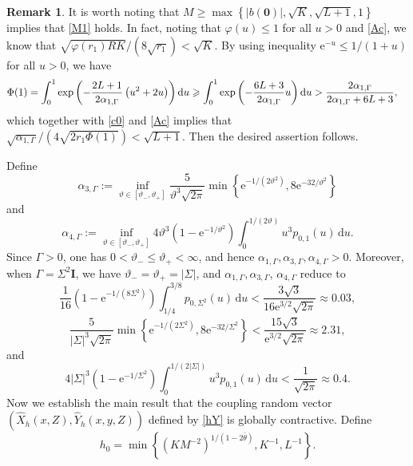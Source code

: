 \documentclass[aap]{imsart}
\theoremstyle{plain}
\theoremstyle{definition}
\newtheorem{remark}{Remark}
\begin{document}
\begin{remark} It is worth noting that   \(M\geqslant \max\left\{|b(\mathbf{0})|, \sqrt{K}, \sqrt{L+1}, 1\right\}\) implies that \eqref{M1} holds.
In fact, noting that $\varphi(u)\leqslant 1$ for all $u>0$ and \eqref{Ac}, we know that
\(\sqrt{\varphi(r_1)RK}/(8\sqrt{r_1})<\sqrt{K}\).
By using inequality \(\mathrm{e}^{-u}\leqslant 1/(1+u)\) for all $u>0$, we have
\begin{align*}
\Phi(1) &= \int_0^1 \mathrm{exp}\left(-\frac{2L+1}{2\alpha_{1, \Gamma}}\left(u^2+2u\right)\right)\mathrm{d} u\geqslant \int_0^1 \mathrm{exp}\left(-\frac{6L+3}{2\alpha_{1, \Gamma}}u\right)\mathrm{d} u> \frac{2\alpha_{1, \Gamma}}{2\alpha_{1, \Gamma}+6L+3},
\end{align*}
which together with \eqref{c0} and \eqref{Ac} implies that
\(\sqrt{\alpha_{1, \Gamma}}/(4\sqrt{2r_1\Phi(1)}) < \sqrt{L+1}\). Then the desired assertion follows.
\end{remark}

Define
\begin{equation}\label{c1}
	\alpha_{3,\Gamma}
	:=
	\inf_{\vartheta\in[\vartheta_-,\vartheta_+]}
	\frac{5}{\vartheta^3\sqrt{2\pi}}
	\min\left\{
	\mathrm e^{-1/(2\vartheta^2)},
	8\mathrm e^{-32/\vartheta^2}
	\right\}
\end{equation}
and 
\begin{equation}\label{c2}
	\alpha_{4,\Gamma}
	:=
	\inf_{\vartheta\in[\vartheta_-,\vartheta_+]}
	4\vartheta^3
	\left(1-\mathrm e^{-1/\vartheta^2}\right)
	\int_0^{1/(2\vartheta)}
	u^3p_{0,1}(u)\,\mathrm du .
\end{equation}
Since \(\Gamma>0\), one has \(0<\vartheta_-\leqslant \vartheta_+<\infty\), and hence \(\alpha_{1, \Gamma}, \alpha_{3,\Gamma},\alpha_{4,\Gamma}>0\).
Moreover, when \(\Gamma=\Sigma^2\mathbf I\), we have
\(\vartheta_-=\vartheta_+=|\Sigma|\), and \(\alpha_{1, \Gamma}, \alpha_{3,\Gamma}\), \(\alpha_{4,\Gamma}\) reduce to
\[\frac1{16}
\left(1-\mathrm e^{-1/(8\Sigma^2)}\right)\int_{1/4}^{3/8}p_{0,\Sigma^2}(u)\,\mathrm du<\frac{3\sqrt{3}}{16\mathrm{e}^{3/2}\sqrt{2\pi}}\approx 0.03,\]
\[\frac{5}{|\Sigma|^3\sqrt{2\pi}}
\min\left\{
\mathrm e^{-1/(2\Sigma^2)},
8\mathrm e^{-32/\Sigma^2}
\right\}<\frac{15\sqrt{3}}{\mathrm{e}^{3/2}\sqrt{2\pi}}\approx 2.31,\]
and
\[4|\Sigma|^3
\left(1-\mathrm e^{-1/\Sigma^2}\right)
\int_0^{1/(2|\Sigma|)}
u^3p_{0,1}(u)\,\mathrm du<\frac{1}{\sqrt{2\pi}}\approx 0.4.\]
Now we establish the main result that the coupling random vector $(\hat{X}_h(x,Z), \hat{Y}_h(x, y,Z))$ defined by \eqref{hY} is globally contractive. Define \begin{equation*}
h_0 = \min\left\{\left(KM^{-2}\right)^{1/(1-2\bar{\theta})}, K^{-1}, L^{-1}\right\}.
\end{equation*}
\end{document}
